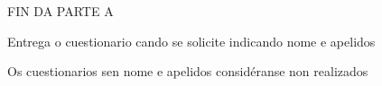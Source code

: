 %
\vspace*{1.50cm}
\begin{center}
    \dotfill
\end{center}
\begin{center}
    \large{FIN DA PARTE A}
    \par
    \vspace{1.0cm}
    Entrega o cuestionario cando se solicite 
    indicando nome e apelidos \\
    \par
    \vspace{0.75cm}
    Os cuestionarios sen nome e apelidos considéranse non realizados
\end{center}%
%
